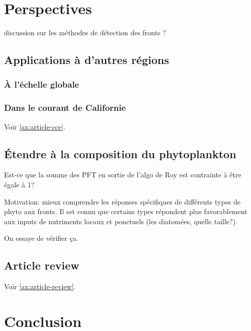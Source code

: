 
\chapter{Perspectives}
\label{chp:perspectives}

\minitoc%
\clearpage

discussion sur les méthodes de détection des fronts ?

\section{Applications à d'autres régions}
\label{sec:appl-autres-regions}

\subsection{À l'échelle globale}
\label{sec:global}

\subsection{Dans le courant de Californie}
\label{sec:CCE}

Voir \cref{ax:article-cce}.

\section{Étendre à la composition du phytoplankton}
\label{sec:persp-pft}

Est-ce que la somme des PFT en sortie de l'algo de Roy est contrainte à être égale à 1?

Motivation: mieux comprendre les réponses spécifiques de différents types de phyto aux fronts.
Il est connu que certains types répondent plus favorablement aux inputs de nutriments locaux et ponctuels (les diatomées, quelle taille?).

On essaye de vérifier ça.

\section{Article review}
\label{sec:review}

Voir \cref{ax:article-review}.

\chapter{Conclusion}
\label{chp:conclusion}
